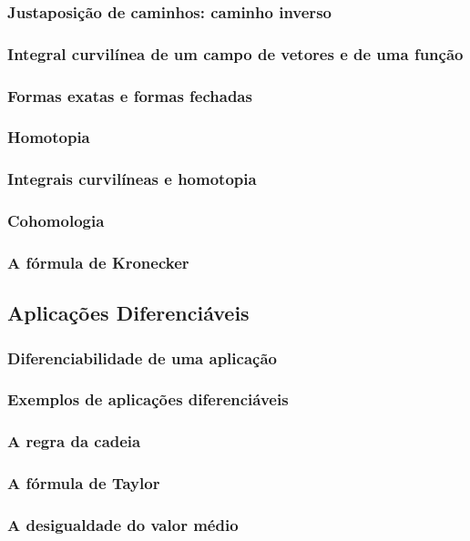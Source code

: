 \documentclass{article}
\theoremstyle{theorem}
\theoremstyle{lemma}
\theoremstyle{definition}
\theoremstyle{remark}
\begin{document}
   \subsubsection{Justaposição de caminhos: caminho inverso}
   \subsubsection{Integral curvilínea de um campo de vetores e de uma função}
   \subsubsection{Formas exatas e formas fechadas}
   \subsubsection{Homotopia}
   \subsubsection{Integrais curvilíneas e homotopia}
   \subsubsection{Cohomologia}
   \subsubsection{ A fórmula de Kronecker}
\subsection{ Aplicações Diferenciáveis}
   \subsubsection{Diferenciabilidade de uma aplicação}
   \subsubsection{Exemplos de aplicações diferenciáveis}
   \subsubsection{A regra da cadeia}
   \subsubsection{A fórmula de Taylor}
   \subsubsection{A desigualdade do valor médio}
\end{document}
